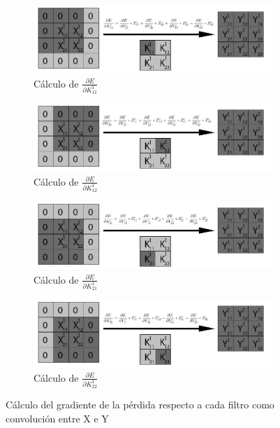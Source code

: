 \begin{figure}[H]
	\centering
	\begin{subfigure}{.5\textwidth}
		\hspace{-25mm}
		\includegraphics[width=1.4\linewidth]{imagenes/conv_back_pad_1.jpg}  
		\caption{Cálculo de $\frac{\partial E}{\partial K^1_{11}}$}
	\end{subfigure}%
	\begin{subfigure}{.5\textwidth}
		\hspace{5mm}
		\includegraphics[width=1.4\linewidth]{imagenes/conv_back_pad_2.jpg}  
		\caption{Cálculo de $\frac{\partial E}{\partial K^1_{12}}$}
	\end{subfigure}
	\vspace{5mm}
	\begin{subfigure}{.5\textwidth}
		\hspace{-25mm}
		\includegraphics[width=1.4\linewidth]{imagenes/conv_back_pad_3.jpg}  
		\caption{Cálculo de $\frac{\partial E}{\partial K^1_{21}}$}
	\end{subfigure}%
	\begin{subfigure}{.5\textwidth}
		\hspace{5mm}
		\includegraphics[width=1.4\linewidth]{imagenes/conv_back_pad_4.jpg}  
		\caption{Cálculo de $\frac{\partial E}{\partial K^1_{22}}$}
	\end{subfigure}
	\caption{Cálculo del gradiente de la pérdida respecto a cada filtro como convolución entre X e Y}
	\label{fig:conv_backprop_como_convolucion_Xpad_Y}
\end{figure}

